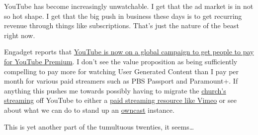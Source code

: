 YouTube has become increasingly unwatchable. I get that the ad market is
in not so hot shape. I get that the big push in business these days is
to get recurring revenue through things like subscriptions. That's just
the nature of the beast right now.

Engadget reports that
\href{https://www.engadget.com/youtube-is-taking-its-fight-against-ad-blockers-global-122041223.html}{YouTube
is now on a global campaign to get people to pay for YouTube Premium}. I
don't see the value proposition as being sufficiently compelling to pay
more for watching User Generated Content than I pay per month for
various paid streamers such as PBS Passport and Paramount+. If anything
this pushes me towards possibly having to migrate the
\href{https://www.genevachurchofchrist.org/sermons}{church's streaming}
off YouTube to either a
\href{https://vimeo.com/features/livestreaming}{paid streaming resource
like Vimeo} or see about what we can do to stand up an
\href{https://owncast.online}{owncast} instance.

This is yet another part of the tumultuous twenties, it seems\ldots{}

